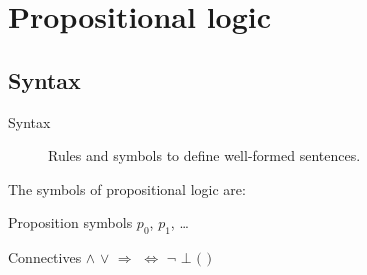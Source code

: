 \chapter{Propositional logic}

\section{Syntax}
\begin{description}
    \item[Syntax] 
        Rules and symbols to define well-formed sentences.
\end{description}

The symbols of propositional logic are:
\begin{descriptionlist}
    \item[Proposition symbols] $p_0$, $p_1$, \dots
    \item[Connectives] $\land$ $\vee$ $\Rightarrow$ $\Leftrightarrow$ $\lnot$ $\bot$ $($ $)$
\end{descriptionlist}

